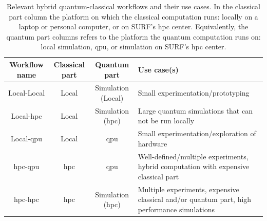 \begin{table}[ht]
    \centering
    {\renewcommand{\arraystretch}{1.35}
        \begin{tabular}{ c|c|c|>{\centering\arraybackslash}m{4.9cm} }
            Workflow name & Classical part & Quantum part & Use case(s) \\
            \hline
            Local-Local & Local & Simulation (Local) & Small experimentation/prototyping \\
            \hline
            Local-\gls{hpc} & Local & Simulation (\gls{hpc}) & Large quantum simulations that can not be run locally \\
            \hline
            Local-\gls{qpu} & Local & \gls{qpu} & Small experimentation/exploration of hardware \\
            \hline
            \gls{hpc}-\gls{qpu} & \gls{hpc} & \gls{qpu} & Well-defined/multiple experiments, hybrid computation with expensive classical part \\
            \hline
            \gls{hpc}-\gls{hpc} & \gls{hpc} & Simulation (\gls{hpc}) & Multiple experiments, expensive classical and/or quantum part, high performance simulations \\
        \end{tabular}
    }
    \caption[Relevant hybrid quantum-classical workflows and their use cases.]{
        Relevant hybrid quantum-classical workflows and their use cases.
        In the classical part column the platform on which the classical computation runs: locally on a laptop or personal computer, or on SURF's \gls{hpc} center.
        Equivalently, the quantum part columns refers to the platform the quantum computation runs on: local simulation, \gls{qpu}, or simulation on SURF's \gls{hpc} center.
    }
    \label{table:hqca-workflows}
\end{table}

